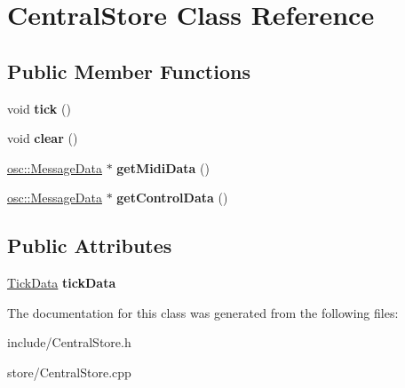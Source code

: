 \hypertarget{classCentralStore}{\section{Central\-Store Class Reference}
\label{classCentralStore}
}
\subsection*{Public Member Functions}
\begin{DoxyCompactItemize}
\item 
\hypertarget{classCentralStore_ab809e0f4e90d4d8d1873a89f3da889b3}{void {\bfseries tick} ()}\label{classCentralStore_ab809e0f4e90d4d8d1873a89f3da889b3}

\item 
\hypertarget{classCentralStore_a100ae6ad2506d4962d23966e23a1c78e}{void {\bfseries clear} ()}\label{classCentralStore_a100ae6ad2506d4962d23966e23a1c78e}

\item 
\hypertarget{classCentralStore_a910470f5eec98b92b82a4cb2f1c5f386}{\hyperlink{classosc_1_1MessageData}{osc\-::\-Message\-Data} $\ast$ {\bfseries get\-Midi\-Data} ()}\label{classCentralStore_a910470f5eec98b92b82a4cb2f1c5f386}

\item 
\hypertarget{classCentralStore_a3faaea58a012d25efaa710fa3d1942b7}{\hyperlink{classosc_1_1MessageData}{osc\-::\-Message\-Data} $\ast$ {\bfseries get\-Control\-Data} ()}\label{classCentralStore_a3faaea58a012d25efaa710fa3d1942b7}

\end{DoxyCompactItemize}
\subsection*{Public Attributes}
\begin{DoxyCompactItemize}
\item 
\hypertarget{classCentralStore_a6f0c4050f0983924bbad8c631746f8b7}{\hyperlink{structTickData}{Tick\-Data} {\bfseries tick\-Data}}\label{classCentralStore_a6f0c4050f0983924bbad8c631746f8b7}

\end{DoxyCompactItemize}


The documentation for this class was generated from the following files\-:\begin{DoxyCompactItemize}
\item 
include/Central\-Store.\-h\item 
store/Central\-Store.\-cpp\end{DoxyCompactItemize}
